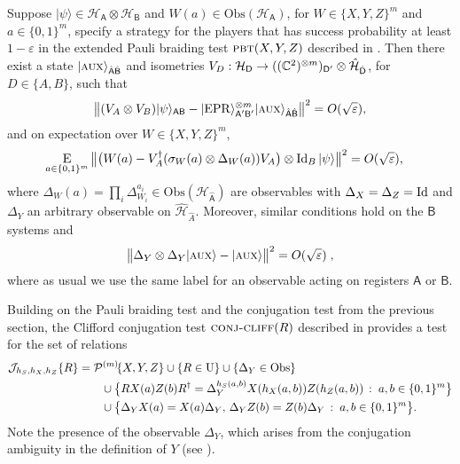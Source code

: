 \documentclass{toc}
\newcommand{\ket}[1]{|#1\rangle}
\newcommand{\Id}{\ensuremath{\mathop{\rm Id}\nolimits}}
\newcommand{\Es}[1]{\ensuremath{\mathop{\textsc{E}}}_{#1}} %
\newcommand{\setft}[1]{\mathrm{#1}}
\newcommand{\Obs}{\setft{Obs}}
\newcommand{\Unitary}{\setft{U}}
\newcommand{\reg}[1]{{\textsf{#1}}}
\newcommand{\mH}{\mathcal{H}}
\newcommand{\eps}{\varepsilon}
\newcommand{\EPR}{{\rm EPR}}
\newcommand{\pbt}{\textsc{pbt}}
\newcommand{\aux}{\textsc {aux}}
\newcommand{\conjc}{\textsc{conj-cliff}}
\newcommand{\conjr}{\mathcal{J}\!}
\newcommand{\paulin}{\mathcal{P}^{(m)}\!}
\begin{document}
\begin{lemma}\label{lem:xyz-rigid}
Suppose $\ket{\psi}\in\mH_\reg{A}\otimes \mH_\reg{B}$ and $W(a) \in \Obs(\mH_\reg{A})$, for $W\in \{X,Y,Z\}^m$ and $a\in\{0,1\}^m$, specify a strategy for the players that has success probability at least $1-\eps$ in the extended Pauli braiding test $\pbt(X,Y,Z)$ described in . 
Then there exist a state $\ket{\aux}_{\hat{\reg{A}}\hat{\reg{B}}}$  and  isometries $V_D:\mH_\reg{D} \to ((\C^2)^{\otimes m})_{\reg{D}'}  \otimes \hat{\mH}_{\hat{\reg{D}}}$, for $D\in\{A,B\}$, such that
$$\big\| (V_A \otimes V_B) \ket{\psi}_{\reg{AB}} - \ket{\EPR}_{\reg{A}'\reg{B}'}^{\otimes m} \ket{\aux}_{\hat{\reg{A}}\hat{\reg{B}}} \big\|^2 = O(\sqrt{\eps}),$$
and on expectation over $W\in \{X,Y,Z\}^m$,
\begin{align}\label{eq:test-sigmay}
 \Es{a\in\{0,1\}^m} \big\| \big(W(a) -V_A^\dagger (\sigma_W(a) \otimes \Delta_W(a)) V_A\big) \otimes \Id_B \ket{\psi} \big\|^2 &= O(\sqrt{\eps}),
\end{align}
where $\Delta_W(a) = \prod_i \Delta_{W_i}^{a_i} \in \Obs({\mH}_{\hat{\reg{A}}})$ are observables with $\Delta_{X}=\Delta_{Z}=\Id$ and $\Delta_{Y}$ an arbitrary observable on $\hat{\mH}_{\hat{A}}$. Moreover, similar conditions hold on the $\reg{B}$ systems and
	$$ \big\|\Delta_Y \otimes \Delta_Y \ket{\aux} - \ket{\aux} \big\|^2 = O(\sqrt{\eps})\;,$$
	where as usual we use the same label for an observable acting on registers $\reg{A}$ or $\reg{B}$. 
\end{lemma} 


Building on the Pauli braiding test and the conjugation test from the previous section, the Clifford conjugation test $\conjc(R)$ described in  
 provides a test for the set of relations 
\begin{align}
\conjr_{h_S,h_X,h_Z}\{R\} &= \paulin\{X,Y,Z\}  \cup \{R\in \Unitary\} \cup \{\Delta_Y\in\Obs\}\notag\\
&\qquad \cup \big\{ R X(a)Z(b)R^\dagger = \Delta_Y^{h_S(a,b)}X(h_X(a,b))Z(h_Z(a,b))\,:\; a,b\in\{0,1\}^m\big\} \notag\\
&\qquad \cup \big\{ \Delta_Y X(a) = X(a)\Delta_Y,\,\Delta_Y Z(b)=Z(b)\Delta_Y\,:\; a,b\in\{0,1\}^m\big\}.\label{eq:def-hr}
\end{align}
Note the presence of the observable $\Delta_Y$, which arises from the conjugation ambiguity in the definition of $Y$ (see ). 
\end{document}
